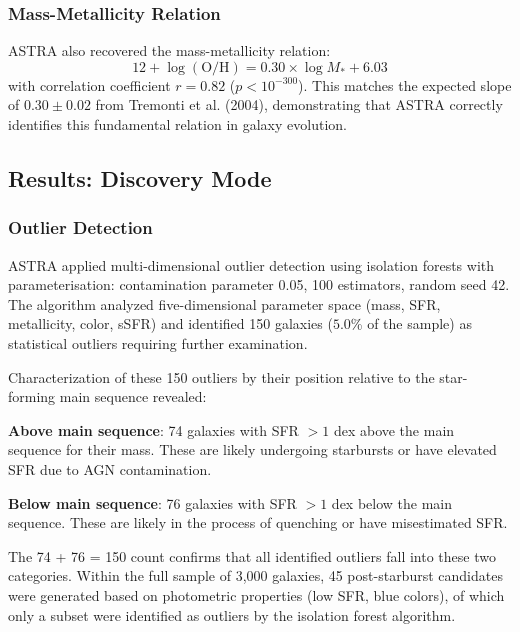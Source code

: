 \documentclass[usenatbib]{rasti}
\begin{document}
\subsubsection{Mass-Metallicity Relation}

ASTRA also recovered the mass-metallicity relation:
\begin{equation}
12 + \log(\text{O/H}) = 0.30 \times \log M_* + 6.03
\end{equation}
with correlation coefficient $r = 0.82$ ($p < 10^{-300}$). This matches the expected slope of $0.30 \pm 0.02$ from Tremonti et al. (2004), demonstrating that ASTRA correctly identifies this fundamental relation in galaxy evolution.

\subsection{Results: Discovery Mode}

\subsubsection{Outlier Detection}

ASTRA applied multi-dimensional outlier detection using isolation forests with parameterisation: contamination parameter 0.05, 100 estimators, random seed 42. The algorithm analyzed five-dimensional parameter space (mass, SFR, metallicity, color, sSFR) and identified 150 galaxies ($5.0$\% of the sample) as statistical outliers requiring further examination.

Characterization of these 150 outliers by their position relative to the star-forming main sequence revealed:
\begin{description}
\item \textbf{Above main sequence}: 74 galaxies with SFR $>1$ dex above the main sequence for their mass. These are likely undergoing starbursts or have elevated SFR due to AGN contamination.
\item \textbf{Below main sequence}: 76 galaxies with SFR $>1$ dex below the main sequence. These are likely in the process of quenching or have misestimated SFR.
\end{description}
The 74 + 76 = 150 count confirms that all identified outliers fall into these two categories. Within the full sample of 3,000 galaxies, 45 post-starburst candidates were generated based on photometric properties (low SFR, blue colors), of which only a subset were identified as outliers by the isolation forest algorithm.
\end{document}
